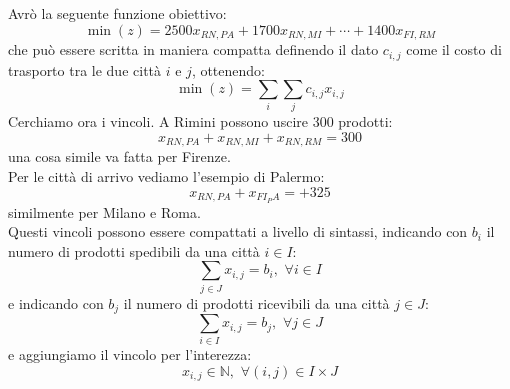 \documentclass[a4paper,12pt, oneside]{book}
\begin{document}
\begin{esercizio}
  Avrò la seguente funzione obiettivo:
  \[\min(z)= 2500x_{RN, PA} + 1700x_{RN, MI}+\cdots + 1400x_{FI,RM}\]
  che può essere scritta in maniera compatta definendo il dato $c_{i,j}$ come il
  costo di trasporto tra le due città $i$ e $j$, ottenendo:
  \[\min(z)=\sum_i\sum_jc_{i,j}x_{i,j}\]
  Cerchiamo ora i vincoli. A Rimini possono uscire 300 prodotti:
  \[x_{RN,PA}+x_{RN,MI}+x_{RN,RM}=300\]
  una cosa simile va fatta per Firenze.\\
  Per le città di arrivo vediamo l'esempio di Palermo:
  \[x_{RN,PA}+x_{FI_PA}=+325\]
  similmente per Milano e Roma.\\
  Questi vincoli possono essere compattati a livello di sintassi,
  indicando con $b_i$ il numero di prodotti spedibili da una città $i\in
  I$:
  \[\sum_{j\in J}x_{i,j}=b_i,\,\, \forall i \in I\]
  e indicando con $b_j$ il numero di prodotti ricevibili da una città
  $j\in J$:
  \[\sum_{i\in I}x_{i,j}=b_j,\,\,\forall j \in J\]
  e aggiungiamo il vincolo per l'interezza:
  \[x_{i,j}\in\mathbb{N},\,\,\forall (i,j)\in I\times J\]
\end{esercizio}
\end{document}

